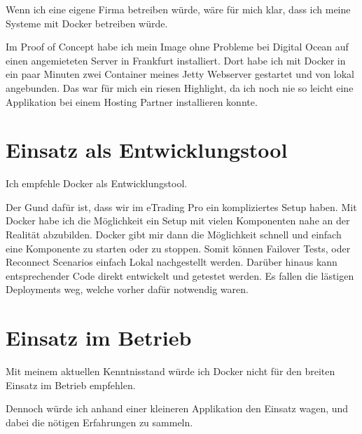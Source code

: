 Wenn ich eine eigene Firma betreiben würde, wäre für mich klar, dass ich meine Systeme mit Docker
betreiben würde.

Im Proof of Concept habe ich mein Image ohne Probleme bei Digital Ocean auf einen angemieteten Server
in Frankfurt installiert. Dort habe ich mit Docker in ein paar Minuten zwei Container meines
Jetty Webserver gestartet und von lokal angebunden. Das war für mich ein riesen Highlight, da ich
noch nie so leicht eine Applikation bei einem Hosting Partner installieren konnte.

\section{Einsatz als Entwicklungstool}

Ich empfehle Docker als Entwicklungstool.

Der Gund dafür ist, dass wir im eTrading Pro ein
kompliziertes Setup haben. Mit Docker habe ich die Möglichkeit ein Setup mit vielen Komponenten
nahe an der Realität abzubilden. Docker gibt mir dann die Möglichkeit schnell und einfach eine
Komponente zu starten oder zu stoppen. Somit können Failover Tests, oder Reconnect Scenarios einfach
Lokal nachgestellt werden. Darüber hinaus kann entsprechender Code direkt entwickelt und getestet
werden. Es fallen die lästigen Deployments weg, welche vorher dafür notwendig waren.

\section{Einsatz im Betrieb}

Mit meinem aktuellen Kenntnisstand würde ich Docker nicht für den breiten Einsatz im Betrieb empfehlen.

Dennoch würde ich anhand einer kleineren Applikation den Einsatz wagen, und dabei die nötigen
Erfahrungen zu sammeln.